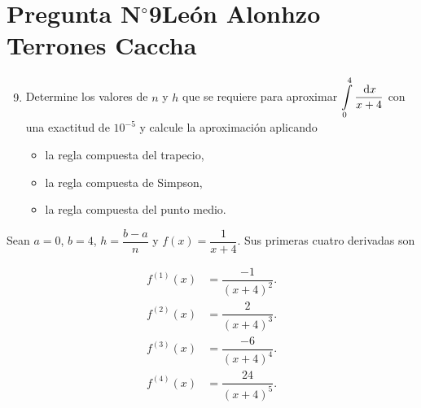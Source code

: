 \section{Pregunta N$^{\circ}$9\qquad León Alonhzo Terrones Caccha}

\begin{frame}
    \begin{enumerate}\setcounter{enumi}{8}
        \item

              Determine los valores de $n$ y $h$ que se requiere para
              aproximar
              \begin{math}
                  \displaystyle
                  \int\limits_{0}^{4}
                  \dfrac{\dl x}{x+4}
              \end{math}
              con una exactitud de $10^{-5}$ y calcule la
              aproximación aplicando

              \begin{itemize}
                  \item

                        la regla compuesta del trapecio,

                  \item

                        la regla compuesta de Simpson,

                  \item

                        la regla compuesta del punto medio.
              \end{itemize}
    \end{enumerate}

    \begin{solution}
        Sean $a=0$, $b=4$, $h=\dfrac{b-a}{n}$ y
        \begin{math}
            f\left(x\right)=
            \dfrac{1}{x+4}
        \end{math}.
        Sus primeras cuatro derivadas son

        \begin{align*}
            f^{\left(1\right)}\left(x\right) &
            =\dfrac{-1}{{\left(x+4\right)}^{2}}. \\
            f^{\left(2\right)}\left(x\right) &
            =\dfrac{2}{{\left(x+4\right)}^{3}}.  \\
            f^{\left(3\right)}\left(x\right) &
            =\dfrac{-6}{{\left(x+4\right)}^{4}}. \\
            f^{\left(4\right)}\left(x\right) &
            =\dfrac{24}{{\left(x+4\right)}^{5}}.
        \end{align*}
    \end{solution}
\end{frame}


